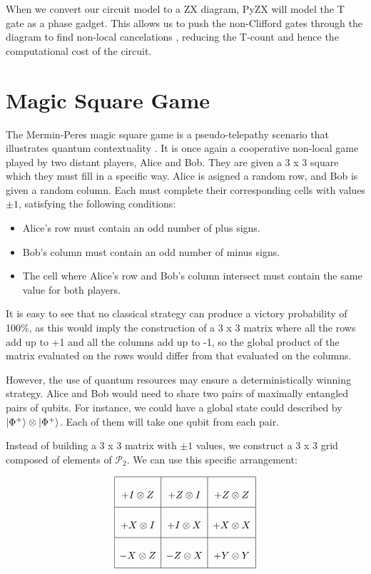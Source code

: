 \documentclass[12pt, twoside, openany]{book}
\begin{document}
When we convert our circuit model to a ZX diagram, PyZX will model the T gate as a phase gadget. This allows us to push the non-Clifford gates through the diagram to find non-local cancelations \cite{PhysRevA.102.022406}, reducing the T-count and hence the computational cost of the circuit. \\

\section{Magic Square Game}

The Mermin-Peres magic square game is a pseudo-telepathy scenario that illustrates quantum contextuality \cite{Laghaout_2022}. It is once again a cooperative non-local game played by two distant players, Alice and Bob. They are given a 3 x 3 square which they must fill in a specific way. Alice is asigned a random row, and Bob is given a random column. Each must complete their corresponding cells with values $\pm1$, satisfying the following conditions:
\begin{itemize}
    \item Alice's row must contain an odd number of plus signs.
    \item Bob's column must contain an odd number of minus signs.
    \item The cell where Alice's row and Bob's column intersect must contain the same value for both players.
\end{itemize}

It is easy to see that no classical strategy can produce a victory probability of 100\%, as this would imply the construction of a 3 x 3 matrix where all the rows add up to +1 and all the columns add up to -1, so the global product of the matrix evaluated on the rows would differ from that evaluated on the columns. 

However, the use of quantum resources may ensure a deterministically winning strategy. Alice and Bob would need to share two pairs of maximally entangled pairs of qubits. For instance, we could have a global state could described by $\ket{\Phi^+} \otimes \ket{\Phi^+}$. Each of them will take one qubit from each pair. 

Instead of building a 3 x 3 matrix with $\pm1$ values, we construct a 3 x 3 grid composed of elements of $\mathcal{P}_2$. We can use this specific arrangement:

\[
\renewcommand{\arraystretch}{2.5}
\begin{array}{|c|c|c|}
\hline
+I \otimes Z & +Z \otimes I & +Z \otimes Z \\
\hline
+X \otimes I & +I \otimes X & +X \otimes X \\
\hline
-X \otimes Z & -Z \otimes X & +Y \otimes Y \\
\hline
\end{array}
\]
\end{document}
